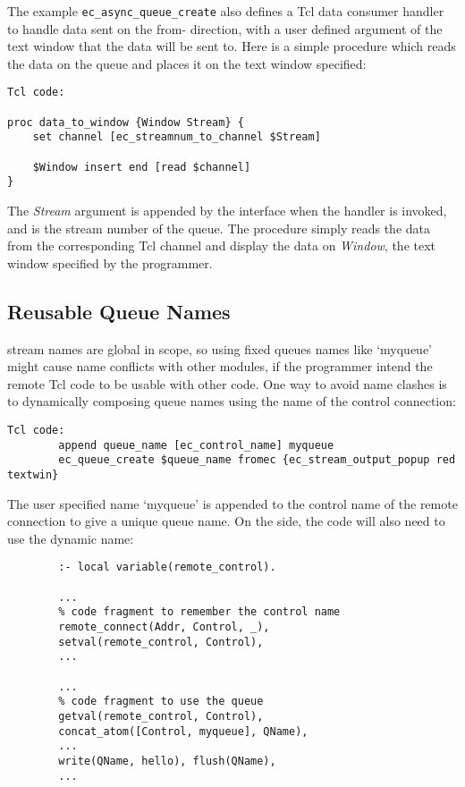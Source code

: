 The example \verb'ec_async_queue_create' also defines a Tcl data consumer
handler to handle data sent on the from-{\eclipse} direction, with a user
defined argument of the text window that the data will be sent to. Here is
a simple procedure which reads the data on the queue and places it on the
text window specified:

\begin{verbatim}
Tcl code:

proc data_to_window {Window Stream} {
    set channel [ec_streamnum_to_channel $Stream]

    $Window insert end [read $channel]
}

\end{verbatim}

The {\it Stream} argument is appended by the interface when the handler is
invoked, and is the {\eclipse} stream number of the queue. The procedure
simply reads the data from the corresponding Tcl channel and display the
data on {\it Window}, the text window specified by the programmer.


\subsection{Reusable Queue Names}

{\eclipse} stream names are global in scope, so using fixed queues names
like `myqueue' might cause name conflicts with other modules, if the
programmer intend the remote Tcl code to be usable with other {\eclipse} code.
One way to avoid name clashes is to dynamically composing queue names using
the name of the control connection:


\begin{verbatim}
Tcl code:
        append queue_name [ec_control_name] myqueue
        ec_queue_create $queue_name fromec {ec_stream_output_popup red textwin}
\end{verbatim}

The user specified name `myqueue' is appended to the control name of the
remote connection to give a unique queue name. On the {\eclipse} side, 
the code will also need to use the dynamic name:

\begin{verbatim}
        :- local variable(remote_control). 

        ...
        % code fragment to remember the control name
        remote_connect(Addr, Control, _),
        setval(remote_control, Control), 
        ...

        ...
        % code fragment to use the queue
        getval(remote_control, Control),
        concat_atom([Control, myqueue], QName),
        ...
        write(QName, hello), flush(QName),
        ...

\end{verbatim}


